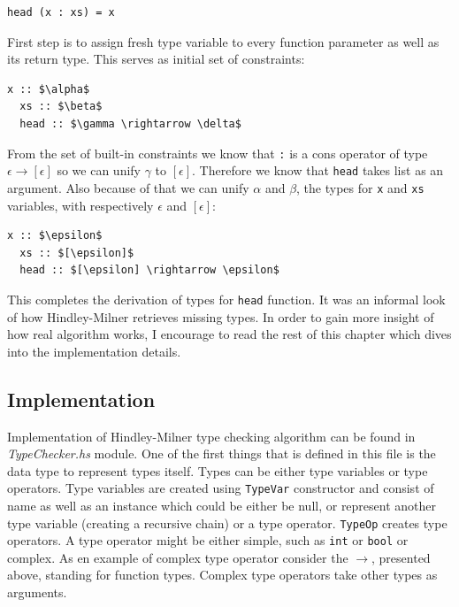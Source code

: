 \documentclass[12pt,a4paper]{report}
\begin{document}
\vspace*{0.2in}
\begin{lstlisting}[style=haskell]
head (x : xs) = x
\end{lstlisting}

First step is to assign fresh type variable to every function parameter as
well as its return type. This serves as initial set of constraints:

\vspace*{0.2in}
\begin{lstlisting}[mathescape=true,style=haskell]
  x :: $\alpha$
  xs :: $\beta$
  head :: $\gamma \rightarrow \delta$
\end{lstlisting}

From the set of built-in constraints we know that \texttt{:} is a cons operator
of type $\epsilon \rightarrow [\epsilon]$ so we can unify $\gamma$ to
$[\epsilon]$. Therefore we know that \texttt{head} takes list as an argument.
Also because of that we can unify $\alpha$ and $\beta$, the types for
\texttt{x} and \texttt{xs} variables, with respectively $\epsilon$ and
$[\epsilon]$:

\vspace*{0.2in}
\begin{lstlisting}[mathescape=true,style=haskell]
  x :: $\epsilon$
  xs :: $[\epsilon]$
  head :: $[\epsilon] \rightarrow \epsilon$
\end{lstlisting}

This completes the derivation of types for \texttt{head} function. It was an
informal look of how Hindley-Milner retrieves missing types. In order to gain
more insight of how real algorithm works, I encourage to read the rest of this
chapter which dives into the implementation details.

\subsection{Implementation}
Implementation of Hindley-Milner type checking algorithm can be found in
\textit{TypeChecker.hs} module. One of the first things that is defined in this
file is the data type to represent types itself. Types can be either type
variables or type operators. Type variables are created using \texttt{TypeVar}
constructor and consist of name as well as an instance which could be either be
null, or represent another type variable (creating a recursive chain) or a type
operator. \texttt{TypeOp} creates type operators. A type operator might
be either simple, such as \texttt{int} or \texttt{bool} or complex. As en
example of complex type operator consider the $\rightarrow$, presented
above, standing for function types. Complex type operators take other types as
arguments.
\end{document}
